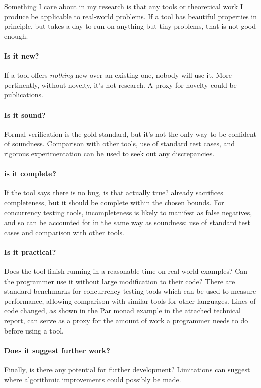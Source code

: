 Something I care about in my research is that any tools or theoretical
work I produce be applicable to real-world problems. If a tool has
beautiful properties in principle, but takes a day to run on anything
but tiny problems, that is not good enough.

\paragraph{Is it new?}

If a tool offers \emph{nothing} new over an existing one, nobody will
use it. More pertinently, without novelty, it's not research. A proxy
for novelty could be publications.

\paragraph{Is it sound?}

Formal verification is the gold standard, but it's not the only way to
be confident of soundness. Comparison with other tools, use of
standard test cases, and rigorous experimentation can be used to seek
out any discrepancies.

\paragraph{is it complete?}

If the tool says there is no bug, is that actually true? \dejafu{}
already sacrifices completeness, but it should be complete within the
chosen bounds. For concurrency testing tools, incompleteness is likely
to manifest as false negatives, and so can be accounted for in the
same way as soundness: use of standard test cases and comparison with
other tools.

\paragraph{Is it practical?}

Does the tool finish running in a reasonable time on real-world
examples? Can the programmer use it without large modification to
their code? There are standard benchmarks for concurrency testing
tools which can be used to measure performance, allowing comparison
with similar tools for other languages. Lines of code changed, as
shown in the Par monad example in the attached technical report, can
serve as a proxy for the amount of work a programmer needs to do
before using a tool.

\paragraph{Does it suggest further work?}

Finally, is there any potential for further development? Limitations
can suggest where algorithmic improvements could possibly be made.
